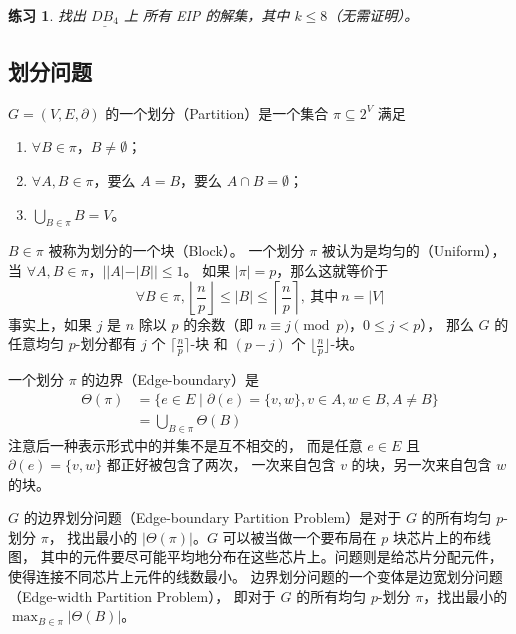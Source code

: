 \documentclass[12pt, a4paper]{article}
\newtheorem{exercise}{练习}
\begin{document}
\begin{exercise}
\label{Exercise 14}
找出 $\underline{DB_4}$ 上 \emph{所有} EIP 的解集，其中 $k \le 8$（无需证明）。
\end{exercise}

\subsection{划分问题}
\label{Subsection 3.3}

$G = (V, E, \partial)$ 的一个划分（Partition）是一个集合 $\pi \subseteq 2^V$ 满足
\begin{enumerate}[(1)]
	\item $\forall B \in \pi$，$B \neq \emptyset$；
	\item $\forall A, B \in \pi$，要么 $A = B$，要么 $A \cap B = \emptyset$；
	\item $\bigcup_{B \in \pi} B = V$。
\end{enumerate}

$B \in \pi$ 被称为划分的一个块（Block）。
一个划分 $\pi$ 被认为是均匀的（Uniform），当 $\forall A, B \in \pi$，$||A| − |B|| \le 1$。
如果 $|\pi| = p$，那么这就等价于
\begin{equation*}
\forall B \in \pi,
\left\lfloor\frac{n}{p}\right\rfloor \le |B| \le \left\lceil\frac{n}{p}\right\rceil,
\ \text{其中}\ n = |V|
\end{equation*}
事实上，如果 $j$ 是 $n$ 除以 $p$ 的余数（即 $n \equiv j \pmod p$，$0 \le j < p$），
那么 $G$ 的任意均匀 $p$-划分都有 $j$ 个 $\lceil\frac{n}{p}\rceil$-块
和 $(p - j)$ 个 $\lfloor\frac{n}{p}\rfloor$-块。

一个划分 $\pi$ 的边界（Edge-boundary）是
\begin{align*}
\Theta(\pi) & = \{e \in E \mid \partial(e) = \{v, w\}, v \in A, w \in B, A \ne B\} \\
	    & = \bigcup_{B \in \pi} \Theta(B)
\end{align*}
注意后一种表示形式中的并集不是互不相交的，
而是任意 $e \in E$ 且 $\partial(e) = \{v, w\}$ 都正好被包含了两次，
一次来自包含 $v$ 的块，另一次来自包含 $w$ 的块。

$G$ 的边界划分问题（Edge-boundary Partition Problem）是对于 $G$ 的所有均匀 $p$-划分 $\pi$，
找出最小的 $|\Theta(\pi)|$。$G$ 可以被当做一个要布局在 $p$ 块芯片上的布线图，
其中的元件要尽可能平均地分布在这些芯片上。问题则是给芯片分配元件，
使得连接不同芯片上元件的线数最小。
边界划分问题的一个变体是边宽划分问题（Edge-width Partition Problem），
即对于 $G$ 的所有均匀 $p$-划分 $\pi$，找出最小的 $\max_{B \in \pi} |\Theta(B)|$。
\end{document}
